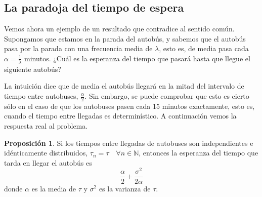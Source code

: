 \documentclass[a4paper,10pt]{scrartcl}
\theoremstyle{definition}
\newtheorem*{fact*}{Proposición}
\numberwithin{equation}{section}
\begin{document}
\subsection{La paradoja del tiempo de espera}
Vemos ahora un ejemplo de un resultado que contradice al sentido común. Supongamos que estamos en la parada del autobús, y sabemos que el autobús pasa por la parada con una frecuencia media de $\lambda$, esto es, de media pasa cada $\alpha=\frac{1}{\lambda}$ minutos. ¿Cuál es la esperanza del tiempo que pasará hasta que llegue el siguiente autobús?

La intuición dice que de media el autobús llegará en la mitad del intervalo de tiempo entre autobuses, $\frac{\alpha}{2}$. Sin embargo, se puede comprobar que esto es cierto sólo en el caso de que los autobuses pasen cada 15 minutos exactamente, esto es, cuando el tiempo entre llegadas es determinístico. A continuación vemos la respuesta real al problema.

\begin{fact*}
  Si los tiempos entre llegadas de autobuses son independientes e idénticamente distribuidos, $\tau_n = \tau \quad \forall n \in \mathbb{N}$, entonces la esperanza del tiempo que tarda en llegar el autobús es
  $$\frac{\alpha}{2} + \frac{\sigma^2}{2\alpha} $$
  donde $\alpha$ es la media de $\tau$ y $\sigma^2$ es la varianza de $\tau$.
\end{fact*}
\end{document}
